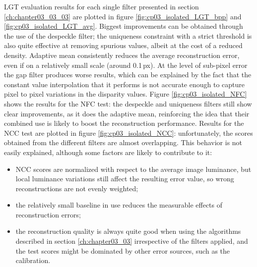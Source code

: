 LGT evaluation results for each single filter presented in section \ref{ch:chapter03_03_03} are plotted in figure \ref{fig:cp03_isolated_LGT_bpp} and \ref{fig:cp03_isolated_LGT_avg}. Biggest improvements can be obtained through the use of the despeckle filter; the uniqueness constraint with a strict threshold is also quite effective at removing spurious values, albeit at the cost of a reduced density. Adaptive mean consistently reduces the average reconstruction error, even if on a relatively small scale (around 0.1\,px). At the level of sub-pixel error the gap filter produces worse results, which can be explained by the fact that the constant value interpolation that it performs is not accurate enough to capture pixel to pixel variations in the disparity values. Figure \ref{fig:cp03_isolated_NFC} shows the results for the NFC test: the despeckle and uniqueness filters still show clear improvements, as it does the adaptive mean, reinforcing the idea that their combined use is likely to boost the reconstruction performance. Results 
for 
the NCC test are plotted in figure \ref{fig:cp03_isolated_NCC}: unfortunately, the scores obtained from the different filters are almost overlapping. This behavior is not easily explained, although some factors are likely to contribute to it:
\begin{itemize}
 \item NCC scores are normalized with respect to the average image luminance, but local luminance variations still affect the resulting error value, so wrong reconstructions are not evenly weighted;
 \item the relatively small baseline in use reduces the measurable effects of reconstruction errors;
 \item the reconstruction quality is always quite good when using the algorithms described in section \ref{ch:chapter03_03} irrespective of the filters applied, and the test scores might be dominated by other error sources, such as the calibration.
\end{itemize}

